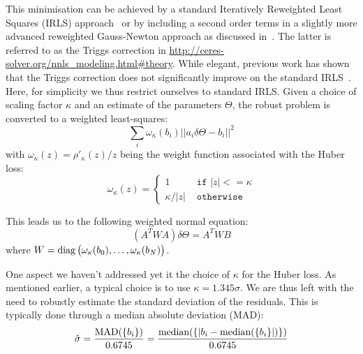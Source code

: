 This minimisation can be achieved by a standard Iteratively Reweighted Least Squares (IRLS) approach~\cite{Green:JRSSB:1984} or by including a second order terms in a slightly more advanced reweighted Gauss-Newton approach as discussed in~\cite{Triggs:VisAlg:2000}.
The latter is referred to as the Triggs correction in \url{http://ceres-solver.org/nnls_modeling.html#theory}. While elegant, previous work has shown that the Triggs correction does not significantly improve on the standard IRLS~\cite{Zach:ECCV:2014,Zach:ECCV:2018}.
Here, for simplicity we thus restrict ourselves to standard IRLS.
Given a choice of scaling factor $\kappa$ and an estimate of the parameters $\Theta$, the robust problem is converted to a weighted least-squares:
\begin{equation}
\sum_i \omega_\kappa(b_i) ||a_i \delta\Theta - b_i||^2
\end{equation}
with $\omega_\kappa(z) = \rho'_\kappa(z) / z$ being the weight function associated with the Huber loss:
\begin{equation}
\omega_\kappa(z) =
\begin{cases}
  1 &\texttt{ if } |z| <= \kappa \\
  \kappa / |z|  &\texttt{ otherwise }
\end{cases}
\end{equation}

This leads us to the following weighted normal equation:
\begin{equation}
(A^T W A) \delta\Theta = A^T W B
\end{equation}
where $W = \operatorname{diag}\big(\omega_\kappa(b_0), \ldots, \omega_\kappa(b_N)\big)$.

One aspect we haven't addressed yet it the choice of $\kappa$ for the Huber loss. As mentioned earlier, a typical choice is to use $\kappa=1.345\sigma$. We are thus left with the need to robustly estimate the standard deviation of the residuals. This is typically done through a median absolute deviation (MAD):
\begin{equation}
\hat{\sigma} = \frac{\operatorname{MAD}(\{b_i\})}{0.6745} = \frac{\operatorname{median}(\{|b_i-\operatorname{median}(\{b_i\}|)\})}{0.6745}
\end{equation}

